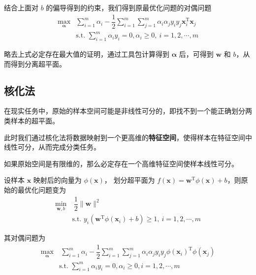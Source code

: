 结合上面对 $b$ 的偏导得到的约束，我们得到原最优化问题的对偶问题
\begin{equation}
    \begin{aligned}
        \underset{\boldsymbol \alpha}{\max}& \sum_{i=1}^m \alpha_i - \dfrac 12 \sum_{i=1}^m\sum_{j=1}^m \alpha_i\alpha_jy_iy_j \boldsymbol x_i^\mathrm T \boldsymbol x_j \\
        &\text{s.t. } \sum_{i=1}^m \alpha_iy_i = 0, \alpha_i \geq 0,\ i = 1, 2, \cdots, m
    \end{aligned}
\end{equation}

略去上式必定存在最大值的证明，通过工具包计算得到 $\boldsymbol \alpha$ 后，可得到 $\boldsymbol w$ 和 $b$，从而得到分离超平面。

\subsection{核化法}
在现实任务中，原始的样本空间可能是非线性可分的，即找不到一个能正确划分两类样本的超平面。

此时我们通过核化法将数据映射到一个更高维的\textbf{特征空间}，使得样本在特征空间中线性可分，从而完成分类任务。
\begin{theorem}
    如果原始空间是有限维的，那么必定存在一个高维特征空间使样本线性可分。
\end{theorem}

设样本 $\boldsymbol x$ 映射后的向量为 $\phi(\boldsymbol x)$，
划分超平面为 $f(\boldsymbol x) = \boldsymbol w^\mathrm T \phi(\boldsymbol x) + b$，则原始的最优化问题变为
\begin{equation}
    \begin{aligned}
        \underset{\boldsymbol w, b}{\min}&\  \dfrac 12 \|\boldsymbol w\|^2 \\
        &\text{s.t. } y_i(\boldsymbol w^\mathrm T\phi(\boldsymbol x_i) + b) \geq 1,\ i = 1, 2, \cdots, m
    \end{aligned}
\end{equation}

其对偶问题为
\begin{equation}
    \begin{aligned}
        \underset{\boldsymbol \alpha}{\max}&\  \sum_{i = 1}^m \alpha_i - \dfrac 12 \sum_{i=1}^{m} \sum_{j=1}^{m} \alpha_{i} \alpha_{j} y_{i} y_{j} \phi\left(\boldsymbol{x}_{i}\right)^{\mathrm{T}} \phi\left(\boldsymbol{x}_{j}\right) \\
        & \text{s.t. } \sum_{i = 1}^m \alpha_iy_i = 0, \alpha_i \geq 0, i = 1, 2, \cdots, m
    \end{aligned}
\end{equation}

